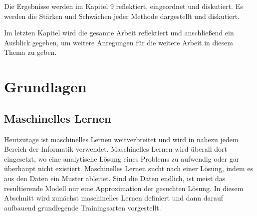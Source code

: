 \documentclass[12pt,letterpaper,ngerman]{article}
\begin{document}
Die Ergebnisse werden im Kapitel 9 reflektiert, eingeordnet und diskutiert. 
Es werden die Stärken und Schwächen jeder Methode dargestellt und diskutiert.

Im letzten Kapitel wird die gesamte Arbeit reflektiert und anschließend ein 
Ausblick gegeben, um weitere Anregungen für die weitere Arbeit in diesem Thema
zu geben.

\pagebreak
\section{Grundlagen}
\subsection{Maschinelles Lernen}
Heutzutage ist maschinelles Lernen weitverbreitet und wird in nahezu jedem
Bereich der Informatik verwendet.  Maschinelles Lernen wird überall dort 
eingesetzt, wo eine analytische Lösung eines Problems zu aufwendig oder gar 
überhaupt nicht existiert. Maschinelles Lernen sucht nach einer Lösung, indem 
es aus den Daten ein Muster ableitet. Sind die Daten endlich, ist meist das 
resultierende Modell nur eine Approximation der gesuchten Lösung. In diesem 
Abschnitt wird zunächst maschinelles Lernen definiert und dann darauf aufbauend 
grundlegende Trainingsarten vorgestellt.
\end{document}
